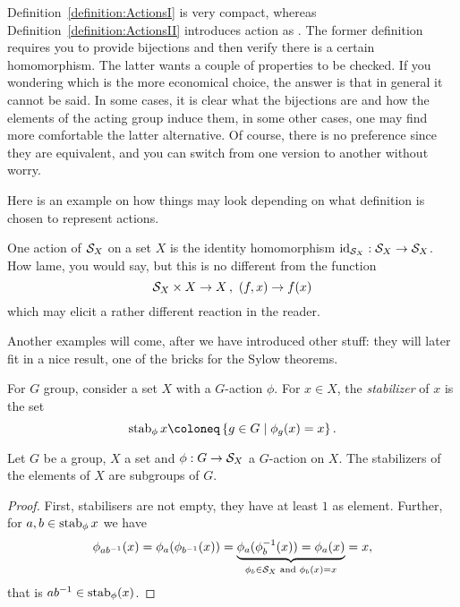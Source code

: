 Definition~\ref{definition:ActionsI} is very compact, whereas Definition~\ref{definition:ActionsII} introduces action as . The former definition requires you to provide bijections and then verify there is a certain homomorphism. The latter wants a couple of properties to be checked. If you wondering which is the more economical choice, the answer is that in general it cannot be said. In some cases, it is clear what the bijections are and how the elements of the acting group induce them, in some other cases, one may find more comfortable the latter alternative. Of course, there is no preference since they are equivalent, and you can switch from one version to another without worry.

Here is an example on how things may look  depending on what definition is chosen to represent actions.

\begin{example}
One action of \(\mathcal S_X\) on a set \(X\) is the identity homomorphism \(\text{id}_{\mathcal S_X} : \mathcal S_X \to \mathcal S_X\). How lame, you would say, but this is no different from the function
\[\mathcal S_X \times X \to X \,, \ (f, x) \to f(x)\]
which may elicit a rather different reaction in the reader.
\end{example}

Another examples will come, after we have introduced other stuff: they will later fit in a nice result, one of the bricks for the Sylow theorems.

\begin{definition}
For \(G\) group, consider a set \(X\) with a \(G\)-action \(\phi\). For \(x \in X\), the {\em stabilizer} of \(x\) is the set
\[\stab_\phi x \coloneq \set{g \in G \mid \phi_g(x) = x} .\]
\end{definition}

\begin{proposition}
Let \(G\) be a group, \(X\) a set and \(\phi : G \to \mathcal S_X\) a \(G\)-action on \(X\). The stabilizers of the elements of \(X\) are subgroups of \(G\).
\end{proposition}

\begin{proof}
First, stabilisers are not empty, they have at least \(1\) as element. Further, for \(a, b \in \operatorname{stab}_\phi x\) we have
\[\phi_{a b^{-1}}(x) = \phi_a (\phi_{b^{-1}} (x)) = \underbrace{\phi_a (\phi^{-1}_b(x)) = \phi_a (x)}_{\phi_b \in \mathcal S_X \text{ and } \phi_b(x) = x} = x ,\]
that is \(a b^{-1} \in \operatorname{stab}_\phi (x)\).
\end{proof}

